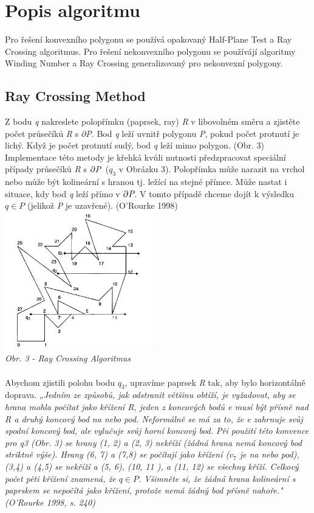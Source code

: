 \documentclass{article}
\begin{document}
\section{\large{Popis algoritmu}}
Pro řešení konvexního polygonu se používá opakovaný Half-Plane Test a Ray Crossing algoritmus. Pro řešení nekonvexního polygonu se používájí algoritmy Winding Number a Ray Crossing generalizovaný pro nekonvexní polygony.
\subsection{\small{Ray Crossing Method}}
Z bodu \emph{q} nakreslete polopřímku (paprsek, ray) \emph{R} v libovolném směru a zjistěte počet průsečíků \emph{R} s $\partial$\emph{P}. Bod \emph{q} leží uvnitř polygonu \emph{P}, pokud počet protnutí je lichý. Když je počet protnutí sudý, bod \emph{q} leží mimo polygon. (Obr. 3)\\
Implementace této metody je křehká kvůli nutnosti předzpracovat speciální případy průsečíků \emph{R} s $\partial\emph{P}$~($q_{3}$ v Obrázku 3). Polopřímka může narazit na vrchol nebo může být kolineární s hranou tj. ležící na stejné přímce. Může nastat i situace, kdy bod \emph{q} leží přímo v $\partial\emph{P}$. V tomto případě chceme dojít k výsledku $q\in P$ (jelikož \emph{P} je uzavřené). (O'Rourke 1998) 
\vspace{0.2cm}\\
\includegraphics[height=60mm]{images/ray_crossing.PNG}\bigskip\\
\textit{\footnotesize{Obr. 3 - Ray Crossing Algoritmus}}\\
\vspace{0.2cm}\\
Abychom zjistili polohu bodu $q_{3}$, upravíme paprsek \emph{R} tak, aby bylo horizontálně doprava. \textit{„Jedním ze způsobů, jak odstranit většinu obtíží, je vyžadovat, aby se hrana mohla počítat jako křížení R, jeden z koncových bodů e musí být přísně nad R a druhý koncový bod na nebo pod. Neformálně se má za to, že e zahrnuje svůj spodní koncový bod, ale vylučuje svůj horní koncový bod. Při použití této konvence pro q3 (Obr. 3) se hrany (1, 2) a (2, 3) nekříží (žádná hrana nemá koncový bod striktně výše). Hrany (6, 7) a (7,8) se počítají jako křížení ($v_{7}$ je na nebo pod), (3,4) a (4,5) se nekříží a (5, 6), (10, 11 ), a (11, 12) se všechny kříží. Celkový počet pěti křížení znamená, že $q\in P$. Všimněte si, že žádná hrana kolineární s paprskem se nepočítá jako křížení, protože nemá žádný bod přísně nahoře." (O'Rourke 1998, s. 240)}
\end{document}

